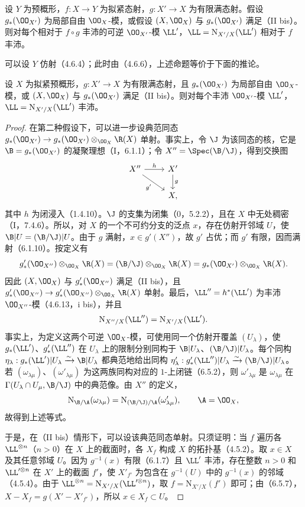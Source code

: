 设 $Y$ 为预概形，$f:X\to Y$ 为拟紧态射，$g:X'\to X$ 为有限满态射。假设 $g_*(\OO_{X'})$ 为局部自由 $\OO_X$-模，或假设 $(X,\OO_X)$ 与 $g_*(\OO_{X'})$ 满足（II bis）。则对每个相对于 $f\circ g$ 丰沛的可逆 $\OO_{X'}$-模 $\LL'$，$\LL=\mathrm N_{X'/X}(\LL')$ 相对于 $f$ 丰沛。

可以设 $Y$ 仿射（4.6.4）；此时由（4.6.6），上述命题等价于下面的推论。

设 $X$ 为拟紧预概形，$g:X'\to X$ 为有限满态射，且 $g_*(\OO_{X'})$ 为局部自由 $\OO_X$-模，或 $(X,\OO_X)$ 与 $g_*(\OO_{X'})$ 满足（II bis）。则对每个丰沛 $\OO_{X'}$-模 $\LL'$，$\LL=\mathrm N_{X'/X}(\LL')$ 丰沛。
\begin{proof}
在第二种假设下，可以进一步设典范同态
$g_*(\OO_{X'})\to g_*(\OO_{X'})\otimes_{\OO_X}\R(X)$ 单射。事实上，令 $\J$ 为该同态的核，它是 $\B=g_*(\OO_{X'})$ 的凝聚理想（I，6.1.1）；令 $X''=\Spec(\B/\J)$，得到交换图
\[
\begin{tikzcd}
X''\arrow[r,"h"]\arrow[dr,"g'"']&X'\arrow[d,"g"]\\
&X,
\end{tikzcd}
\]
其中 $h$ 为闭浸入（1.4.10）。$\J$ 的支集为闭集（0，5.2.2），且在 $X$ 中无处稠密（I，7.4.6）。所以，对 $X$ 的一个不可约分支的泛点 $x$，存在仿射开邻域 $U$，使 $\B|U=(\B/\J)|U$。由于 $g$ 满射，$x\in g'(X'')$，故 $g'$ 占优；而 $g'$ 有限，因而满射（6.1.10）。按定义有
\[
g'_*(\OO_{X''})\otimes_{\OO_X}\R(X)
=(\B/\J)\otimes_{\OO_X}\R(X)
=g_*(\OO_{X'})\otimes_{\OO_X}\R(X).
\]
因此 $(X,\OO_X)$ 与 $g'_*(\OO_{X''})$ 满足（II bis），且
$g'_*(\OO_{X''})\to g'_*(\OO_{X''})\otimes_{\OO_X}\R(X)$ 单射。最后，$\LL''=h^*(\LL')$ 为丰沛 $\OO_{X''}$-模（4.6.13，i bis），并且
\[
\mathrm N_{X''/X}(\LL'')=\mathrm N_{X'/X}(\LL').
\]
事实上，为定义这两个可逆 $\OO_X$-模，可使用同一个仿射开覆盖 $(U_\lambda)$，使 $g_*(\LL')$、$g'_*(\LL'')$ 在 $U_\lambda$ 上的限制分别同构于 $\B|U_\lambda$、$(\B/\J)|U_\lambda$。每个同构
$\eta_\lambda:g_*(\LL')|U_\lambda\xrightarrow{\sim}\B|U_\lambda$
都典范地给出同构
$\eta'_\lambda:g'_*(\LL'')|U_\lambda\xrightarrow{\sim}(\B/\J)|U_\lambda$。
若 $(\omega_{\lambda\mu})$、$(\omega'_{\lambda\mu})$ 为这两族同构对应的 $1$-上闭链（6.5.2），则 $\omega'_{\lambda\mu}$ 是 $\omega_{\lambda\mu}$ 在
$\Gamma(U_\lambda\cap U_\mu,\B/\J)$ 中的典范像。由 $X''$ 的定义，
\[
\mathrm N_{\B/\A}(\omega_{\lambda\mu})
=\mathrm N_{(\B/\J)/\A}(\omega'_{\lambda\mu}),\qquad\A=\OO_X,
\]
故得到上述等式。

于是，在（II bis）情形下，可以设该典范同态单射。只须证明：当 $f$ 遍历各 $\LL^{\otimes n}$（$n>0$）在 $X$ 上的截面时，各 $X_f$ 构成 $X$ 的拓扑基（4.5.2）。取 $x\in X$ 及其任意邻域 $U$。因为 $g^{-1}(x)$ 有限（6.1.7）且 $\LL'$ 丰沛，存在整数 $n>0$ 和 $\LL'^{\otimes n}$ 在 $X'$ 上的截面 $f'$，使 $X'_{f'}$ 为包含在 $g^{-1}(U)$ 中的 $g^{-1}(x)$ 的邻域（4.5.4）。由于
$\LL^{\otimes n}=\mathrm N_{X'/X}(\LL'^{\otimes n})$，取 $f=\mathrm N_{X'/X}(f')$ 即可；由（6.5.7），$X-X_f=g(X'-X'_{f'})$，所以 $x\in X_f\subset U$。
\end{proof}

